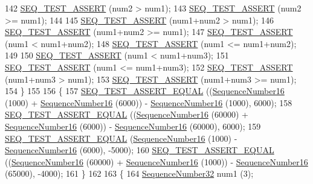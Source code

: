 \begin{DoxyCode}
142     \hyperlink{sequence-number-test-suite_8cc_a6fa0724417167ff8a5aee24421cc7c44}{SEQ\_TEST\_ASSERT} (num2 > num1);
143     \hyperlink{sequence-number-test-suite_8cc_a6fa0724417167ff8a5aee24421cc7c44}{SEQ\_TEST\_ASSERT} (num2 >= num1);
144 
145     \hyperlink{sequence-number-test-suite_8cc_a6fa0724417167ff8a5aee24421cc7c44}{SEQ\_TEST\_ASSERT} (num1+num2 > num1);
146     \hyperlink{sequence-number-test-suite_8cc_a6fa0724417167ff8a5aee24421cc7c44}{SEQ\_TEST\_ASSERT} (num1+num2 >= num1);
147     \hyperlink{sequence-number-test-suite_8cc_a6fa0724417167ff8a5aee24421cc7c44}{SEQ\_TEST\_ASSERT} (num1 < num1+num2);
148     \hyperlink{sequence-number-test-suite_8cc_a6fa0724417167ff8a5aee24421cc7c44}{SEQ\_TEST\_ASSERT} (num1 <= num1+num2);
149 
150     \hyperlink{sequence-number-test-suite_8cc_a6fa0724417167ff8a5aee24421cc7c44}{SEQ\_TEST\_ASSERT} (num1 < num1+num3);
151     \hyperlink{sequence-number-test-suite_8cc_a6fa0724417167ff8a5aee24421cc7c44}{SEQ\_TEST\_ASSERT} (num1 <= num1+num3);
152     \hyperlink{sequence-number-test-suite_8cc_a6fa0724417167ff8a5aee24421cc7c44}{SEQ\_TEST\_ASSERT} (num1+num3 > num1);
153     \hyperlink{sequence-number-test-suite_8cc_a6fa0724417167ff8a5aee24421cc7c44}{SEQ\_TEST\_ASSERT} (num1+num3 >= num1);
154   \}
155 
156   \{
157     \hyperlink{sequence-number-test-suite_8cc_a406e684f8ee1fd1d725d8f96966ec9ff}{SEQ\_TEST\_ASSERT\_EQUAL} ((\hyperlink{classns3_1_1SequenceNumber}{SequenceNumber16} (1000) + 
      \hyperlink{classns3_1_1SequenceNumber}{SequenceNumber16} (6000)) - \hyperlink{classns3_1_1SequenceNumber}{SequenceNumber16} (1000), 6000);
158     \hyperlink{sequence-number-test-suite_8cc_a406e684f8ee1fd1d725d8f96966ec9ff}{SEQ\_TEST\_ASSERT\_EQUAL} ((\hyperlink{classns3_1_1SequenceNumber}{SequenceNumber16} (60000) + 
      \hyperlink{classns3_1_1SequenceNumber}{SequenceNumber16} (6000)) - \hyperlink{classns3_1_1SequenceNumber}{SequenceNumber16} (60000), 6000);
159     \hyperlink{sequence-number-test-suite_8cc_a406e684f8ee1fd1d725d8f96966ec9ff}{SEQ\_TEST\_ASSERT\_EQUAL} (\hyperlink{classns3_1_1SequenceNumber}{SequenceNumber16} (1000) - 
      \hyperlink{classns3_1_1SequenceNumber}{SequenceNumber16} (6000), -5000);
160     \hyperlink{sequence-number-test-suite_8cc_a406e684f8ee1fd1d725d8f96966ec9ff}{SEQ\_TEST\_ASSERT\_EQUAL} ((\hyperlink{classns3_1_1SequenceNumber}{SequenceNumber16} (60000) + 
      \hyperlink{classns3_1_1SequenceNumber}{SequenceNumber16} (1000)) - \hyperlink{classns3_1_1SequenceNumber}{SequenceNumber16} (65000), -4000);
161   \}
162 
163   \{
164     \hyperlink{classns3_1_1SequenceNumber}{SequenceNumber32} num1 (3);

\end{DoxyCode}

